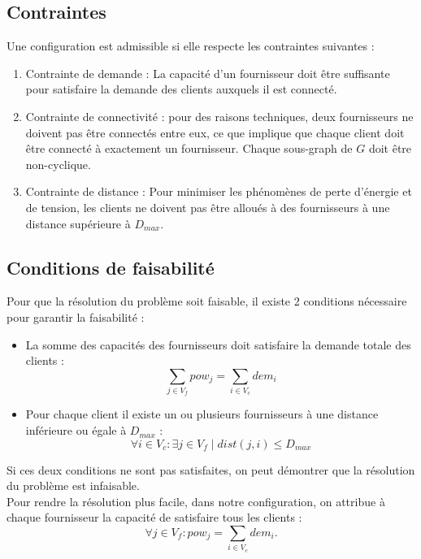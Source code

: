 \documentclass[letterpaper]{article}
\begin{document}
\subsection{Contraintes}
Une configuration est admissible si elle respecte les contraintes suivantes :
\begin{enumerate}
\item Contrainte de demande : La capacité d'un fournisseur doit être suffisante pour satisfaire la demande des clients auxquels il est connecté.
\item Contrainte de connectivité : pour des raisons techniques, deux fournisseurs ne doivent pas être connectés entre eux, ce que implique que chaque client doit être connecté à exactement un fournisseur. Chaque sous-graph de $G$ doit être non-cyclique.
\item Contrainte de distance : Pour minimiser les phénomènes de perte d'énergie et de tension, les clients ne doivent pas être alloués à des fournisseurs à une distance supérieure à $D_{max}$.   
\end{enumerate}
\subsection{Conditions de faisabilité}
Pour que la résolution du problème soit faisable, il existe 2 conditions nécessaire pour garantir la faisabilité :
\begin{itemize}
\item La somme des capacités des fournisseurs doit satisfaire la demande totale des clients : \begin{equation*}
\sum_{j \in V_{f}}{pow_{j}}  = \sum_{i \in V_{c}}{dem_{i}}
\end{equation*}
\item Pour chaque client il existe un ou plusieurs fournisseurs à une distance inférieure ou égale à $D_{max}$ :
\begin{equation*}
\forall i \in V_{c} :  \exists j \in V_{f} \mid dist(j,i) \leq D_{max}
\end{equation*}
\end{itemize}
Si ces deux conditions ne sont pas satisfaites, on peut démontrer que la résolution du problème est infaisable.\\
Pour rendre la résolution plus facile, dans notre configuration, on attribue à chaque fournisseur la capacité de satisfaire tous les clients : 
\begin{equation*}
\forall j \in V_{f} : pow_{j}=\sum_{i \in V_{c}}{dem_{i}}.
\end{equation*}
\end{document}

